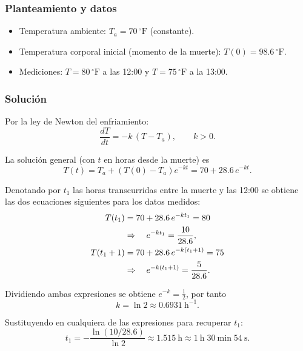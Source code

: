 \documentclass[a4paper,10pt]{article}
\begin{document}
	\subsubsection{Planteamiento y datos}
	\medskip
	\begin{itemize}
		\item Temperatura ambiente: $T_a = 70\,^{\circ}\mathrm{F}$ (constante).
		\item Temperatura corporal inicial (momento de la muerte): $T(0)=98.6\,^{\circ}\mathrm{F}$.
		\item Mediciones: $T=80\,^{\circ}\mathrm{F}$ a las 12:00 y $T=75\,^{\circ}\mathrm{F}$ a la 13:00.
	\end{itemize}

	\subsubsection{Solución}
	\medskip
	Por la ley de Newton del enfriamiento:
	\begin{equation}\label{eq:newton}
		\frac{dT}{dt} = -k\,(T-T_a),\qquad k>0.
	\end{equation}

	La solución general (con $t$ en horas desde la muerte) es
	\begin{equation}\label{eq:solNewton}
		T(t)=T_a + (T(0)-T_a)e^{-k t} = 70 + 28.6\,e^{-k t}.
	\end{equation}

	Denotando por $t_1$ las horas transcurridas entre la muerte y las 12:00 se obtiene
	las dos ecuaciones siguientes para los datos medidos:
	\begin{align}
		T(t_1) &= 70+28.6\,e^{-k t_1}=80 \\%
		&\Rightarrow\quad e^{-k t_1}=\frac{10}{28.6}, \notag\\
		T(t_1+1) &= 70+28.6\,e^{-k(t_1+1)}=75 \\%
		&\Rightarrow\quad e^{-k(t_1+1)}=\frac{5}{28.6}. \notag
	\end{align}

	Dividiendo ambas expresiones se obtiene $e^{-k}=\tfrac{1}{2}$, por tanto
	\begin{equation}
		k = \ln 2 \approx 0.6931\ \mathrm{h}^{-1}.
	\end{equation}

	Sustituyendo en cualquiera de las expresiones para recuperar $t_1$:
	\begin{equation}
		t_1 = -\frac{\ln(10/28.6)}{\ln 2} \approx 1.515\ \mathrm{h} \approx 1\ \mathrm{h}\;30\ \mathrm{min}\;54\ \mathrm{s}.
	\end{equation}
\end{document}
